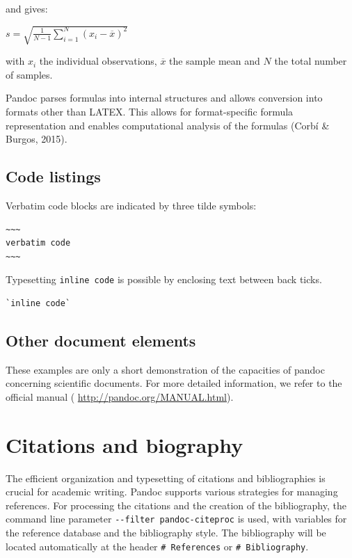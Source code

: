 \documentclass[10pt,fleqn]{wlpeerj}
\begin{document}
and gives:

\(s=\sqrt{\frac{1}{N-1}\sum_{i=1}^N(x_i-\overline{x})^{2}}\)

with \(x_i\) the individual observations, \(\overline{x}\) the sample
mean and \(N\) the total number of samples.

Pandoc parses formulas into internal structures and allows conversion
into formats other than LATEX. This allows for format-specific formula
representation and enables computational analysis of the formulas (Corbí
\& Burgos, 2015).

\subsection{Code listings}\label{code-listings}

Verbatim code blocks are indicated by three tilde symbols:

\begin{verbatim}
~~~
verbatim code
~~~
\end{verbatim}

Typesetting \texttt{inline\ code} is possible by enclosing text between
back ticks.

\begin{verbatim}
`inline code`
\end{verbatim}

\subsection{Other document elements}\label{other-document-elements}

These examples are only a short demonstration of the capacities of
pandoc concerning scientific documents. For more detailed information,
we refer to the official manual ( \url{http://pandoc.org/MANUAL.html}).

\section{Citations and biography}\label{citations-and-biography}

The efficient organization and typesetting of citations and
bibliographies is crucial for academic writing. Pandoc supports various
strategies for managing references. For processing the citations and the
creation of the bibliography, the command line parameter
\texttt{-\/-filter\ pandoc-citeproc} is used, with variables for the
reference database and the bibliography style. The bibliography will be
located automatically at the header \texttt{\#\ References} or
\texttt{\#\ Bibliography}.
\end{document}
